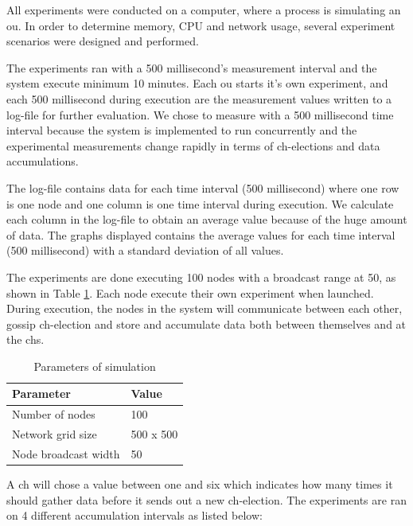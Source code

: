 \documentclass[USenglish]{uit-thesis}
\begin{document}
All experiments were conducted on a computer, where a process is simulating an \gls{ou}. In order to determine memory, CPU and network usage, several experiment scenarios were designed and performed.

The experiments ran with a 500 millisecond's measurement interval and the system execute minimum 10 minutes. Each \gls{ou} starts it's own experiment, and each 500 millisecond during execution are the measurement values written to a log-file for further evaluation. We chose to measure with a 500 millisecond time interval because the system is implemented to run concurrently and the experimental measurements change rapidly in terms of \gls{ch}-elections and data accumulations. 

The log-file contains data for each time interval (500 millisecond) where  one row is one node and one column is one time interval during execution. We calculate each column in the log-file to obtain an average value because of the huge amount of data. The graphs displayed contains the average values for each time interval (500 millisecond) with a standard deviation of all values.

The experiments are done executing 100 nodes with a broadcast range at 50, as shown in Table \ref{tab:simTable}. Each node execute their own experiment when launched. During execution, the nodes in the system will communicate between each other, gossip \gls{ch}-election and store and accumulate data both between themselves and at the \glspl{ch}.

\begin{table} [t]
\centering
\begin{tabular}{|l|l|}
\hline
\textbf{Parameter}       & \textbf{Value} \\ \hline
Number of nodes          & 100            \\ \hline
Network grid size        & 500 x 500      \\ \hline
Node broadcast width     & 50             \\ \hline
\end{tabular}
\caption{Parameters of simulation}
\label{tab:simTable}
\end{table}


A \gls{ch} will chose a value between one and six which indicates how many times it should gather data before it sends out a new \gls{ch}-election. The experiments are ran on 4 different accumulation intervals as listed below:
\end{document}
